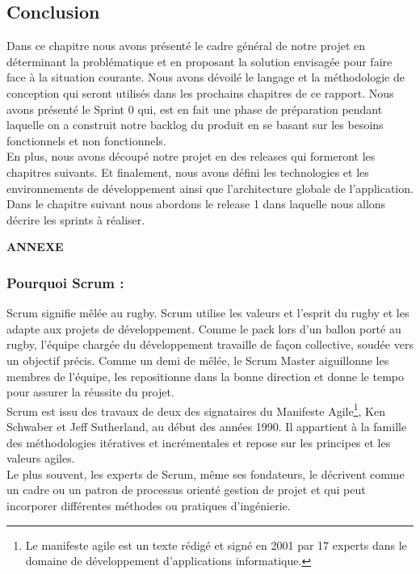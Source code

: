 \documentclass{article}
\begin{document}
\subsection{Conclusion}
Dans ce chapitre nous avons présenté le cadre général de notre projet en déterminant la problématique et en proposant la solution envisagée pour faire face à la situation courante. Nous avons dévoilé le langage et la méthodologie de conception qui seront utilisés dans les prochains chapitres de ce rapport. Nous avons présenté le Sprint 0 qui, est en fait une phase de préparation pendant laquelle on a construit notre backlog du produit en se basant sur les besoins fonctionnels et non fonctionnels.\\ En plus, nous avons découpé notre projet en des releases qui formeront les chapitres suivants. Et finalement, nous avons défini les technologies et les environnements de développement ainsi que l’architecture globale de l’application.
Dans le chapitre suivant nous abordons le release 1 dans laquelle nous allons décrire les sprints à réaliser.
\cleardoublepage
\begin{titlepage}\centering
\vspace*{\fill}
\textbf{\LARGE ANNEXE }
\vspace*{\fill}
\end{titlepage}
\setcounter{page}{41}
\appendix
\subsubsection*{Pourquoi Scrum :}
\vspace{0.5cm}
\vspace{0.3cm}

\guillemotleft Scrum signifie mêlée au rugby. Scrum utilise les valeurs et l’esprit du rugby et les adapte aux projets de développement. Comme le pack lors d’un ballon porté au rugby, l’équipe chargée du développement travaille de façon collective, soudée vers un objectif précis. Comme un demi de mêlée, le Scrum Master aiguillonne les membres de l’équipe, les repositionne dans la bonne direction et donne le tempo pour assurer la réussite du projet. \guillemotright [1]\\\label{sec:hello}
Scrum est issu des travaux de deux des signataires du Manifeste Agile\footnote{Le manifeste agile est un texte rédigé et signé en 2001 par 17 experts dans le domaine de développement d’applications informatique.}, Ken Schwaber et Jeff Sutherland, au début des années 1990. Il appartient à la famille des méthodologies itératives et incrémentales et repose sur les principes et les valeurs agiles.\\
Le plus souvent, les experts de Scrum, même ses fondateurs, le décrivent comme un cadre ou un patron de processus orienté gestion de projet et qui peut incorporer différentes méthodes ou pratiques d’ingénierie.
\end{document}
